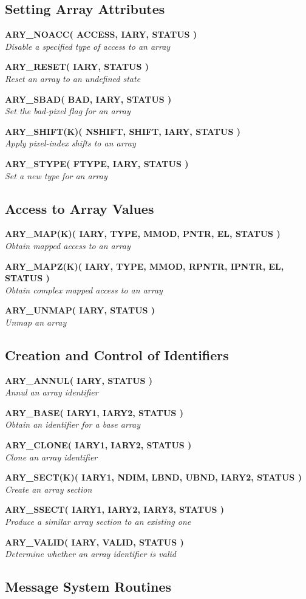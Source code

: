 \documentclass[twoside,11pt,nolof]{starlink}
\providecommand{\noteroutine}[2]{\textbf{#1}\hspace*{\fill}\nopagebreak \\
                             \hspace*{3em}\emph{#2}\hspace*{\fill}\par}
\begin{document}
\subsection{Setting Array Attributes}
\label{setting_array_attributes}

\noteroutine{ARY\_NOACC( ACCESS, IARY, STATUS )}
            {Disable a specified type of access to an array}
\noteroutine{ARY\_RESET( IARY, STATUS )}
            {Reset an array to an undefined state}
\noteroutine{ARY\_SBAD( BAD, IARY, STATUS )}
            {Set the bad-pixel flag for an array}
\noteroutine{ARY\_SHIFT(K)( NSHIFT, SHIFT, IARY, STATUS )}
            {Apply pixel-index shifts to an array}
\noteroutine{ARY\_STYPE( FTYPE, IARY, STATUS )}
            {Set a new type for an array}


\subsection{Access to Array Values}
\label{access_to_array_values}

\noteroutine{ARY\_MAP(K)( IARY, TYPE, MMOD, PNTR, EL, STATUS )}
            {Obtain mapped access to an array}
\noteroutine{ARY\_MAPZ(K)( IARY, TYPE, MMOD, RPNTR, IPNTR, EL, STATUS )}
            {Obtain complex mapped access to an array}
\noteroutine{ARY\_UNMAP( IARY, STATUS )}
            {Unmap an array}


\subsection{%
Creation and Control of Identifiers}
\label{creation_and_control_of_identifiers}

\noteroutine{ARY\_ANNUL( IARY, STATUS )}
            {Annul an array identifier}
\noteroutine{ARY\_BASE( IARY1, IARY2, STATUS )}
            {Obtain an identifier for a base array}
\noteroutine{ARY\_CLONE( IARY1, IARY2, STATUS )}
            {Clone an array identifier}
\noteroutine{ARY\_SECT(K)( IARY1, NDIM, LBND, UBND, IARY2, STATUS )}
            {Create an array section}
\noteroutine{ARY\_SSECT( IARY1, IARY2, IARY3, STATUS )}
            {Produce a similar array section to an existing one}
\noteroutine{ARY\_VALID( IARY, VALID, STATUS )}
            {Determine whether an array identifier is valid}


\subsection{Message System Routines}
\label{message_system_routines}
\end{document}
